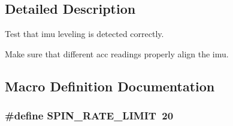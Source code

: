 \subsection{Detailed Description}

\begin{DoxyItemize}
\item Test that imu leveling is detected correctly.
\item Make sure that different acc readings properly align the imu. 
\end{DoxyItemize}

\subsection{Macro Definition Documentation}
\hypertarget{group__IMU_ga86bbc61e689c15e74cf01916d16894fe}{
\subsubsection[{S\+P\+I\+N\+\_\+\+R\+A\+T\+E\+\_\+\+L\+I\+M\+I\+T}]{\setlength{\rightskip}{0pt plus 5cm}\#define S\+P\+I\+N\+\_\+\+R\+A\+T\+E\+\_\+\+L\+I\+M\+I\+T~20}}\label{group__IMU_ga86bbc61e689c15e74cf01916d16894fe}



